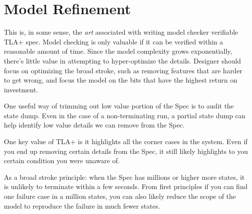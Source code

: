 \section{Model Refinement}

This is, in some sense, the \textit{art} associated with writing model checker
verifiable TLA+ spec. Model checking is only valuable if it can be verified
within a reasonable amount of time. Since the model complexity grows
exponentially, there's little value in attempting to hyper-optimize the details.
Designer should focus on optimizing the broad stroke, such as removing features 
that are harder to get wrong, and focus the model on the bits that have the
highest return on investment.\newline

One useful way of trimming out low value portion of the Spec is to audit the
state dump. Even in the case of a non-terminating run, a partial state dump can
help identify low value details we can remove from the Spec.\newline

One key value of TLA+ is it highlights all the corner cases in the system. Even
if you end up removing certain details from the Spec, it still likely highlights
to you certain condition you were unaware of.\newline

As a broad stroke principle: when the Spec has millions or higher more states,
it is unlikely to terminate within a few seconds. From first principles if you
can find one failure case in a million states, you can also likely reduce the 
scope of the model to reproduce the failure in much fewer states.